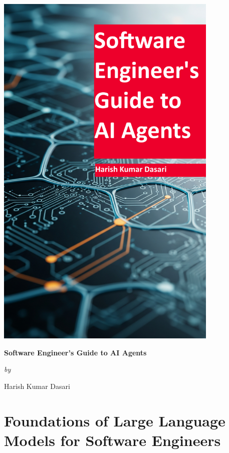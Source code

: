\documentclass{book}
\begin{document}
	\begin{titlepage}
		\centering
		\includegraphics[width=0.8\textwidth]{diagrams/cover.png}
	\end{titlepage}
	
	\begin{center}
		\vspace*{1cm}
		{\Huge\bfseries Software Engineer's Guide to AI Agents\par}
		\vspace{1cm}
		{\Large\itshape by\par}
		\vspace{1cm}
		{\Large Harish Kumar Dasari\par}
	\end{center}

	\frontmatter
	\tableofcontents
	
	\mainmatter
	
	\part{Foundations of Large Language Models for Software Engineers}
	
\end{document}
